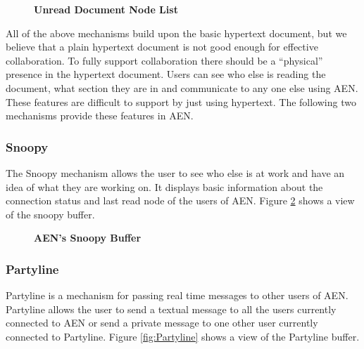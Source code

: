 \begin{figure}[htb]
  \centerline{}
  \caption{{\bf Unread Document Node List}}
  \label{fig:nodelist}
\end{figure}



All of the above mechanisms build upon the basic hypertext document, but we
believe that a plain hypertext document is not good enough for effective
collaboration.  To fully support collaboration there should be a
``physical'' presence in the hypertext document.  Users can
see who else is reading the document, what section they are in and
communicate to any one else using AEN.  These features are difficult to
support by just using hypertext.  The following two mechanisms provide
these features in AEN.


\subsubsection{Snoopy}
The Snoopy mechanism allows the user to see who else is at work and have an
idea of what they are working on.  It displays basic information about the
connection status and last read node of the users of AEN.  Figure
\ref{fig:snoopy} shows a view of the snoopy buffer.

\begin{figure}[htb]
  \centerline{}
  \caption{{\bf AEN's Snoopy Buffer}}
  \label{fig:snoopy}
\end{figure}

\newpage
\subsubsection{Partyline}
Partyline is a mechanism for passing real time messages to other users of
AEN.  Partyline allows the user to send a textual message to all the users
currently connected to AEN or send a private message to one other user
currently connected to Partyline.  Figure \ref{fig:Partyline} shows a view
of the Partyline buffer.

